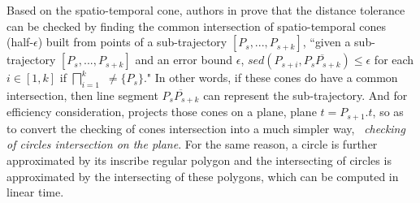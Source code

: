 Based on the spatio-temporal cone, authors in \cite{Lin:Cised} prove that the \sed distance tolerance can be checked by finding the common intersection of spatio-temporal cones  (half-$\epsilon$) built from points of a sub-trajectory $[P_s,...,P_{s+k}]$, \ie ``{given a sub-trajectory $[P_s,...,P_{s+k}]$ and an error bound $\epsilon$, $sed(P_{s+i}, \overline{P_sP_{s+k}})\le \epsilon$ for each $i \in [1,k]$ if  $\bigsqcap_{i=1}^{k}$ $\ne \{P_s\}$}."
In other words, if these cones do have a common intersection, then line segment $\overline{P_sP_{s+k}}$ can represent the sub-trajectory. And for efficiency consideration, \cised projects those cones on a plane, \eg plane $t=P_{s+1}.t$, so as to convert the checking of cones intersection into a much simpler way, \ie~\textit{checking of circles intersection on the plane}.
For the same reason, a circle is further approximated by its inscribe regular polygon and the intersecting of circles is approximated by the intersecting of these polygons, which can be computed in linear time.
%




